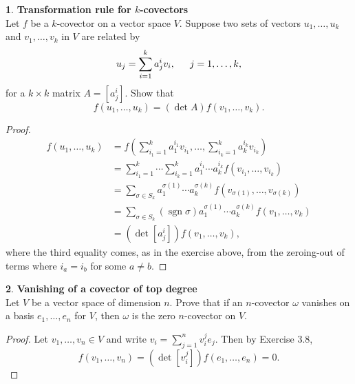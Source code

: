 \documentclass[12pt]{article}
\DeclareMathOperator{\sgn}{sgn}
\theoremstyle{definition}
\newtheorem{ex}{}[section]
\begin{document}
\break

\begin{ex}
	\textbf{Transformation rule for $k$-covectors} \\
	Let $f$ be a $k$-covector on a vector space $V$.
	Suppose two sets of vectors $u_1, \dots, u_k$ and $v_1, \dots, v_k$ in $V$ are related by \begin{equation*}
		u_j = \sum_{i = 1}^k a^i_j v_i, \hspace{1.5em} j = 1, \dots, k,
	\end{equation*}
	for a $k \times k$ matrix $A = [a^i_j]$.
	Show that \begin{equation*}
		f(u_1, \dots, u_k) = (\det A)f(v_1, \dots, v_k).
	\end{equation*}
\end{ex}
\begin{proof}
	\begin{align*}
		f(u_1, \dots, u_k) & = f\left(\sum_{{i_1}=1}^k a^{i_1}_1v_{i_1}, \dots, \sum_{{i_k}=1}^k a^{i_k}_kv_{i_k}\right)          \\
		                   & = \sum_{i_1 = 1}^k \cdots \sum_{i_k = 1}^k a_1^{i_1} \cdots a_k^{i_k} f(v_{i_1}, \dots, v_{i_k})     \\
		                   & = \sum_{\sigma \in S_k} a_1^{\sigma(1)}\cdots a_k^{\sigma(k)} f(v_{\sigma(1)}, \dots, v_{\sigma(k)}) \\
		                   & = \sum_{\sigma \in S_k} (\sgn \sigma) a_1^{\sigma(1)}\cdots a_k^{\sigma(k)} f(v_1, \dots, v_k)       \\
		                   & = (\det [a^i_j]) f(v_1, \dots, v_k),
	\end{align*}
	where the third equality comes, as in the exercise above, from the zeroing-out of terms where $i_a = i_b$ for some $a \neq b$.
\end{proof}

\begin{ex}
	\textbf{Vanishing of a covector of top degree} \\
	Let $V$ be a vector space of dimension $n$.
	Prove that if an $n$-covector $\omega$ vanishes on a basis $e_1, \dots, e_n$ for $V$, then $\omega$ is the zero $n$-covector on $V$.
\end{ex}
\begin{proof}
	Let $v_1, \dots, v_n \in V$ and write $v_i = \sum_{j=1}^n v_i^je_j$.
	Then by Exercise 3.8, \begin{equation*}
		f(v_1, \dots, v_n) = (\det [v_i^j])f(e_1, \dots, e_n) = 0.
	\end{equation*}
\end{proof}
\end{document}
